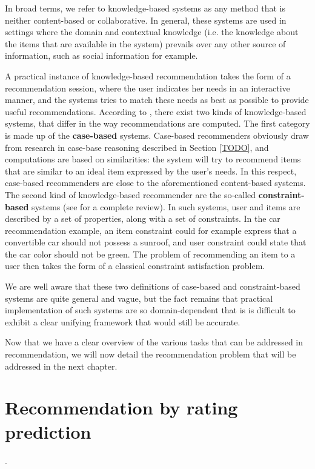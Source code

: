 In broad terms, we refer to knowledge-based systems as any method that is
neither content-based or collaborative. In general, these systems are used in
settings where the domain and contextual knowledge (i.e. the knowledge about the
items that are available in the system) prevails over any other source of
information, such as social information for example.

A practical instance of  knowledge-based recommendation takes the form of a
recommendation session, where the user indicates her needs in an interactive
manner, and the systems tries to match these needs as best as possible to
provide useful recommendations. According to \cite{FelBur08}, there exist two
kinds of knowledge-based systems, that differ in the way recommendations are
computed. The first category is made up of the \textbf{case-based} systems.
Case-based recommenders obviously draw from research in case-base reasoning
described in Section \ref{TODO}, and computations are based on similarities:
the system will try to recommend items that are similar to an ideal item
expressed by the user's needs. In
this respect, case-based recommenders are close to the aforementioned
content-based systems. The second  kind of knowledge-based recommender are the
so-called \textbf{constraint-based} systems (see \cite{FelFriJanZan11} for a complete
review). In such systems, user and items are described
by a set of properties, along with a set of constraints. In the car
recommendation example, an item constraint could for example express that a
convertible car should not possess a sunroof, and user constraint could state
that the car color should not be green. The problem of recommending an item to
a user then takes the form of a classical constraint satisfaction
problem.

We are well aware that these two definitions of case-based and constraint-based
systems are quite general and vague, but the fact remains that practical
implementation of such systems are so domain-dependent that is is difficult to
exhibit a clear unifying framework that would still be accurate.

Now that we have a clear overview of the various tasks that can be addressed in
recommendation, we will now detail the recommendation problem that will be
addressed in the next chapter.

\section{Recommendation by rating prediction}.
\label{SEC:recommendation_rating_prediction}

